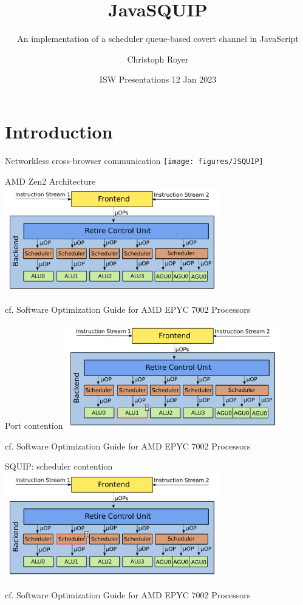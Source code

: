 \documentclass[aspectratio=169]{beamer}
\title[Short Title]{JavaSQUIP}
\subtitle[Subtitle]{An implementation of a scheduler queue-based covert channel in JavaScript}
\author{Christoph Royer}
\date{ISW Presentations 12 Jan 2023}
\institute{IAIK}
\begin{document}
\begin{frame}[plain]
  \maketitle
\end{frame}


\section{Introduction}

\begin{frame}{Networkless cross-browser communication}
  \centering
  \texttt{[image: figures/JSQUIP]}
\end{frame}

\begin{frame}{AMD Zen2 Architecture}
\centering
\includegraphics[page=1, width=0.7\textwidth]{figures/Zen2arch.pdf}

\tiny{cf. Software Optimization Guide for AMD EPYC 7002 Processors}
\end{frame}

\begin{frame}{Port contention}
\centering
\includegraphics[page=1, width=0.7\textwidth]{figures/Zen2ALU.pdf}

\tiny{cf. Software Optimization Guide for AMD EPYC 7002 Processors}
\end{frame}


\begin{frame}{SQUIP: scheduler contention}
  \centering
  \includegraphics[page=1, width=0.7\textwidth]{figures/Zen2Scheduler.pdf}

  \tiny{cf. Software Optimization Guide for AMD EPYC 7002 Processors}
\end{frame}
\end{document}
